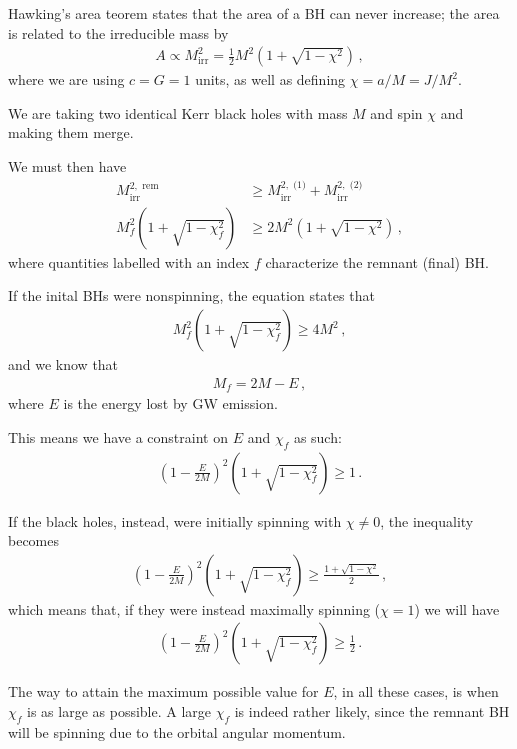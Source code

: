 \documentclass[main.tex]{subfiles}
\begin{document}
Hawking's area teorem states that the area of a BH can never increase; the area is related to the irreducible mass by 
%
\begin{align}
A \propto M _{\text{irr}}^2 = \frac{1}{2} M^2\left(1 + \sqrt{1 - \chi^2}\right)
\,,
\end{align}
%
where we are using \(c = G = 1\) units, as well as defining \(\chi = a / M = J / M^2\).  

We are taking two identical Kerr black holes with mass \(M\) and spin \(\chi\) and making them merge. 

We must then have %
\begin{align}
M_{\text{irr}}^{2, \text{ rem}} &\geq 
M^{2, \text{ (1)}} _{\text{irr}}  +
M^{2, \text{ (2)}} _{\text{irr}}  
\\
M_f^2 \left( 1+ \sqrt{1 - \chi _f^2}\right) &\geq 2 M^2\left(1 + \sqrt{1 - \chi^2}\right)
\,,
\end{align}
%
where quantities labelled with an index \(f\) characterize the remnant  (final) BH. 

If the inital BHs were nonspinning, the equation states that %
\begin{align}
M_f^2 \left(1 + \sqrt{1 - \chi _f^2}\right) \geq 4 M^2
\,,
\end{align}
%
and we know that %
\begin{align}
M_f = 2M - E
\,,
\end{align}
%
where \(E\) is the energy lost by GW emission. 

This means we have a constraint on \(E\) and \(\chi _f\) as such: %
\begin{align}
\left(1 - \frac{E}{2M}\right)^2 \left(1 + \sqrt{1 - \chi _f^2}\right) \geq 1
\,.
\end{align}

If the black holes, instead, were initially spinning with \(\chi \neq 0\), the inequality becomes %
\begin{align}
\left(1 - \frac{E}{2M}\right)^2 \left(1 + \sqrt{1 - \chi _f^2}\right) \geq \frac{1 + \sqrt{1 - \chi^2}}{2}
\,,
\end{align}
%
which means that, if they were instead maximally spinning (\(\chi = 1\)) we will have 
%
\begin{align}
\left(1 - \frac{E}{2M}\right)^2 \left(1 + \sqrt{1 - \chi _f^2}\right) \geq \frac{1}{2}
\,.
\end{align}

The way to attain the maximum possible value for \(E\), in all these cases, is when \(\chi _f\) is as large as possible. 
A large \(\chi _f\) is indeed rather likely, since the remnant BH will be spinning due to the orbital angular momentum. 
\end{document}
